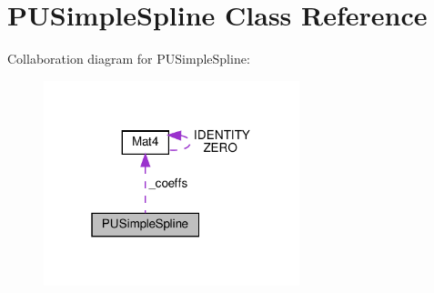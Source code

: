 \hypertarget{classPUSimpleSpline}{}\section{P\+U\+Simple\+Spline Class Reference}
\label{classPUSimpleSpline}


Collaboration diagram for P\+U\+Simple\+Spline\+:
\nopagebreak
\begin{figure}[H]
\begin{center}
\leavevmode
\includegraphics[width=211pt]{classPUSimpleSpline__coll__graph}
\end{center}
\end{figure}
